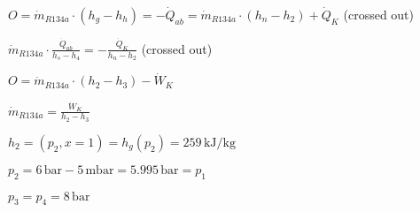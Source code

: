 \( O = \dot{m}_{R134a} \cdot (h_g - h_h) = -\dot{Q}_{ab} = \dot{m}_{R134a} \cdot (h_n - h_2) + \dot{Q}_K \) (crossed out)  

\( \dot{m}_{R134a} \cdot \frac{\dot{Q}_{ab}}{h_s - h_4} = -\frac{\dot{Q}_K}{h_n - h_2} \) (crossed out)  

\( O = \dot{m}_{R134a} \cdot (h_2 - h_3) - \dot{W}_K \)  

\( \dot{m}_{R134a} = \frac{\dot{W}_K}{h_2 - h_3} \)  

\( h_2 = (p_2, x = 1) = h_g(p_2) = 259 \, \text{kJ/kg} \)  

\( p_2 = 6 \, \text{bar} - 5 \, \text{mbar} = 5.995 \, \text{bar} = p_1 \)  

\( p_3 = p_4 = 8 \, \text{bar} \)